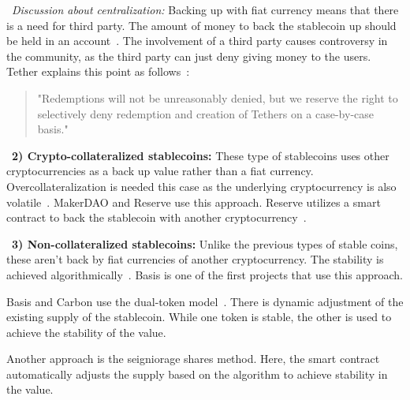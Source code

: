 ~\textit{Discussion about centralization:} Backing up with fiat currency means that there is a need for third party. The amount of money to back the stablecoin up should be held in an account~\cite{techrev}. The involvement of a third party causes controversy in the community, as the third party can just deny giving money to the users. Tether explains this point as follows~\cite{cryptoinsider}:

\begin{quote}
"Redemptions will not be unreasonably denied, but we reserve the right to selectively deny redemption and creation of Tethers on a case-by-case basis."
\end{quote}


~\textbf{2) Crypto-collateralized stablecoins:} These type of stablecoins uses other cryptocurrencies as a back up value rather than a fiat currency. Overcollateralization is needed this case as the underlying cryptocurrency is also volatile~\cite{linkedin}. MakerDAO and Reserve use this approach. Reserve utilizes a smart contract to back the stablecoin with another cryptocurrency~\cite{cointelegraph}.

~\textbf{3) Non-collateralized stablecoins:} Unlike the previous types of stable coins, these aren't back by fiat currencies of another cryptocurrency. The stability is achieved algorithmically~\cite{linkedin}. Basis is one of the first projects that use this approach.

Basis and Carbon use the dual-token model~\cite{cryptoinsider}. There is dynamic adjustment of the existing supply of the stablecoin. While one token is stable, the other is used to achieve the stability of the value.




Another approach is the seigniorage shares method\cite{overview}. Here, the smart contract automatically adjusts the supply based on the algorithm to achieve stability in the value.


